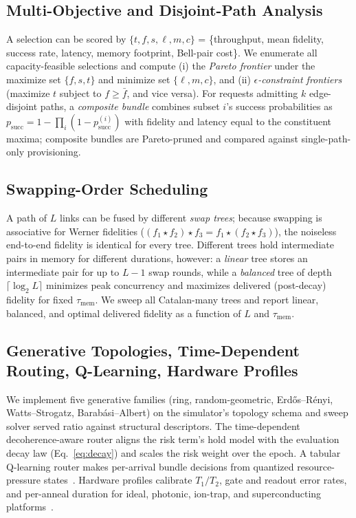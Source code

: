 \documentclass[twocolumn]{article}
\begin{document}
\subsection{Multi-Objective and Disjoint-Path Analysis}
\label{sec:multiobj}

A selection can be scored by $\{t,f,s,\ell,m,c\}$ = \{throughput, mean
fidelity, success rate, latency, memory footprint, Bell-pair cost\}.
We enumerate all capacity-feasible selections and compute (i) the
\emph{Pareto frontier} under the maximize set $\{f,s,t\}$ and minimize
set $\{\ell,m,c\}$, and (ii) \emph{$\epsilon$-constraint frontiers}
(maximize $t$ subject to $f \ge \bar f$, and vice versa).  For requests
admitting $k$ edge-disjoint paths, a \emph{composite bundle} combines
subset $i$'s success probabilities as
$p_{\text{succ}} = 1 - \prod_i (1 - p_{\text{succ}}^{(i)})$ with
fidelity and latency equal to the constituent maxima; composite
bundles are Pareto-pruned and compared against single-path-only
provisioning.

\subsection{Swapping-Order Scheduling}
\label{sec:swapping}

A path of $L$ links can be fused by different \emph{swap trees};
because swapping is associative for Werner fidelities
($(f_1 \star f_2) \star f_3 = f_1 \star (f_2 \star f_3)$), the
noiseless end-to-end fidelity is identical for every tree.  Different
trees hold intermediate pairs in memory for different durations,
however: a \emph{linear} tree stores an intermediate pair for up to
$L-1$ swap rounds, while a \emph{balanced} tree of depth
$\lceil\log_2 L\rceil$ minimizes peak concurrency and maximizes
delivered (post-decay) fidelity for fixed $\tau_{\text{mem}}$.  We
sweep all Catalan-many trees and report linear, balanced, and optimal
delivered fidelity as a function of $L$ and $\tau_{\text{mem}}$.

\subsection{Generative Topologies, Time-Dependent Routing,
Q-Learning, Hardware Profiles}
\label{sec:extras}

We implement five generative families (ring, random-geometric,
Erd\H{o}s--R\'enyi, Watts--Strogatz, Barab\'asi--Albert) on the
simulator's topology schema and sweep solver served ratio against
structural descriptors.  The time-dependent decoherence-aware router
aligns the risk term's hold model with the evaluation decay law
(Eq.~\eqref{eq:decay}) and scales the risk weight over the epoch.  A
tabular Q-learning router makes per-arrival bundle decisions from
quantized resource-pressure states~\cite{li2025qlearning,
boyan1993packet}.  Hardware profiles calibrate $T_1/T_2$, gate and
readout error rates, and per-anneal duration for ideal, photonic,
ion-trap, and superconducting platforms~\cite{lvovsky2009optical}.
\end{document}
